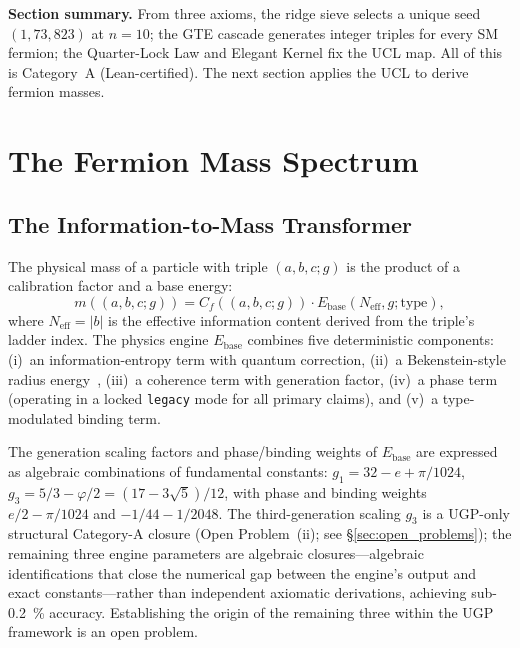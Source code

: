 \documentclass[11pt]{article}
\theoremstyle{remark}
\newcommand{\Cf}{C_{\!f}}
\newcommand{\triple}{(a,b,c;g)}
\begin{document}
\begin{tcolorbox}[colback=gray!4,colframe=gray!40,left=5pt,right=5pt,top=3pt,bottom=3pt]
\small\textbf{Section summary.}
From three axioms, the ridge sieve selects a unique seed $(1,73,823)$ at $n{=}10$; the GTE cascade generates integer triples for every SM fermion; the Quarter-Lock Law and Elegant Kernel fix the UCL map.  All of this is Category~A (Lean-certified).
The next section applies the UCL to derive fermion masses.
\end{tcolorbox}


\section{The Fermion Mass Spectrum}
\label{sec:masses}

\subsection{The Information-to-Mass Transformer}
\label{subsec:mass_map}

The physical mass of a particle with triple $\triple$ is the product of a calibration factor and a base energy:
\begin{equation}
m(\triple) = \Cf(\triple) \cdot E_{\mathrm{base}}(N_{\mathrm{eff}}, g; \text{type}),
\label{eq:mass}
\end{equation}
where $N_{\mathrm{eff}} = |b|$ is the effective information content derived from the triple's ladder index.
The physics engine $E_{\mathrm{base}}$ combines five deterministic components: (i)~an information-entropy term with quantum correction, (ii)~a Bekenstein-style radius energy~\cite{Bekenstein1973}, (iii)~a coherence term with generation factor, (iv)~a phase term (operating in a locked \texttt{legacy} mode for all primary claims), and (v)~a type-modulated binding term.

The generation scaling factors and phase/binding weights of $E_{\mathrm{base}}$ are expressed as algebraic combinations of fundamental constants:
$g_1 = 32 - e + \pi/1024$, $g_3 = 5/3 - \varphi/2 = (17 - 3\sqrt{5})/12$,
with phase and binding weights $e/2 - \pi/1024$ and $-1/44 - 1/2048$.
The third-generation scaling $g_3$ is a UGP-only structural Category-A closure (Open Problem~(ii); see \S\ref{sec:open_problems}); the remaining three engine parameters are algebraic closures---algebraic identifications that close the numerical gap between the engine's output and exact constants---rather than independent axiomatic derivations, achieving sub-\SI{0.2}{\percent} accuracy.
Establishing the origin of the remaining three within the UGP framework is an open problem.
\end{document}

